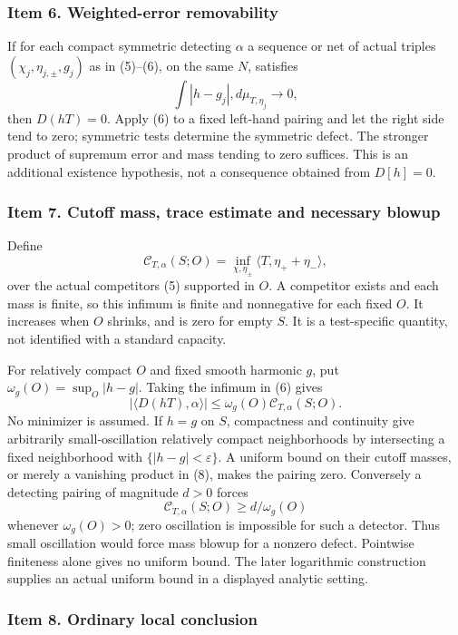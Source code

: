 \documentclass[11pt]{article}
\begin{document}
\subsubsection{Item 6. Weighted-error removability}

If for each compact symmetric detecting \(\alpha\) a sequence or net of actual triples \((\chi_j,\eta_{j,\pm},g_j)\) as in (5)--(6), on the same \(N\), satisfies
\[
 \int|h-g_j|,d\mu_{T,\eta_j}\longrightarrow0,
\]
then \(D(hT)=0\). Apply (6) to a fixed left-hand pairing and let the right side tend to zero; symmetric tests determine the symmetric defect. The stronger product of supremum error and mass tending to zero suffices. This is an additional existence hypothesis, not a consequence obtained from \(D[h]=0\).

\subsubsection{Item 7. Cutoff mass, trace estimate and necessary blowup}

Define
\[
 \mathcal C_{T,\alpha}(S;O)=
 \inf_{\chi,\eta_\pm}\langle T,\eta_++\eta_-\rangle,
 \tag{7}
\]
over the actual competitors (5) supported in \(O\). A competitor exists and each mass is finite, so this infimum is finite and nonnegative for each fixed \(O\). It increases when \(O\) shrinks, and is zero for empty \(S\). It is a test-specific quantity, not identified with a standard capacity.

For relatively compact \(O\) and fixed smooth harmonic \(g\), put \(\omega_g(O)=\sup_O|h-g|\). Taking the infimum in (6) gives
\[
 |\langle D(hT),\alpha\rangle|
 \leq\omega_g(O)\mathcal C_{T,\alpha}(S;O).\tag{8}
\]
No minimizer is assumed. If \(h=g\) on \(S\), compactness and continuity give arbitrarily small-oscillation relatively compact neighborhoods by intersecting a fixed neighborhood with \(\{|h-g|<\varepsilon\}\). A uniform bound on their cutoff masses, or merely a vanishing product in (8), makes the pairing zero. Conversely a detecting pairing of magnitude \(d>0\) forces
\[
 \mathcal C_{T,\alpha}(S;O)\geq d/\omega_g(O)
\]
whenever \(\omega_g(O)>0\); zero oscillation is impossible for such a detector. Thus small oscillation would force mass blowup for a nonzero defect. Pointwise finiteness alone gives no uniform bound. The later logarithmic construction supplies an actual uniform bound in a displayed analytic setting.

\subsubsection{Item 8. Ordinary local conclusion}
\end{document}
